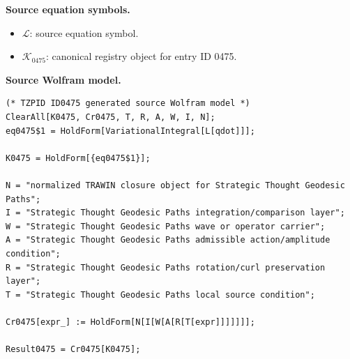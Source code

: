 \begin{minipage}[t]{0.49\linewidth}
\begingroup
\small
\raggedright
\textbf{Source equation symbols.}\par
\begin{itemize}[leftmargin=1.35em,itemsep=1pt,topsep=1pt,parsep=0pt]
    \item $\mathcal{L}$: source equation symbol.
    \item $\mathcal{K}_{0475}$: canonical registry object for entry ID 0475.
\end{itemize}
\endgroup
\end{minipage}\hfill
\begin{minipage}[t]{0.47\linewidth}
\begingroup
\scriptsize
\raggedright
\textbf{Source Wolfram model.}\par
\begin{Verbatim}[fontsize=\tiny,breaklines=true,breakanywhere=true]
(* TZPID ID0475 generated source Wolfram model *)
ClearAll[K0475, Cr0475, T, R, A, W, I, N];
eq0475$1 = HoldForm[VariationalIntegral[L[qdot]]];

K0475 = HoldForm[{eq0475$1}];

N = "normalized TRAWIN closure object for Strategic Thought Geodesic Paths";
I = "Strategic Thought Geodesic Paths integration/comparison layer";
W = "Strategic Thought Geodesic Paths wave or operator carrier";
A = "Strategic Thought Geodesic Paths admissible action/amplitude condition";
R = "Strategic Thought Geodesic Paths rotation/curl preservation layer";
T = "Strategic Thought Geodesic Paths local source condition";

Cr0475[expr_] := HoldForm[N[I[W[A[R[T[expr]]]]]]];

Result0475 = Cr0475[K0475];
\end{Verbatim}
\endgroup
\end{minipage}

